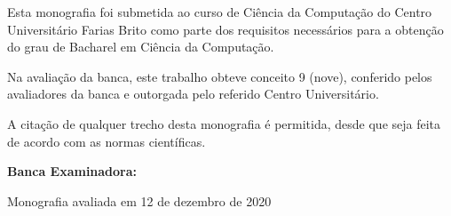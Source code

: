 \begin{folhadeaprovacao}


\begin{center}
    {\ABNTEXchapterfont\Large\bfseries\imprimirtitulo}\par
    {\ABNTEXchapterfont\large\textsc{\imprimirautor}}
\end{center}

\vspace{1cm}

Esta monografia foi submetida ao curso de Ciência da Computação do Centro Universitário Farias Brito como parte dos requisitos necessários para a obtenção do grau de Bacharel em Ciência da Computação.

\vspace{1cm}

Na avaliação da banca, este trabalho obteve conceito 9 (nove), conferido pelos avaliadores da banca e outorgada pelo referido Centro Universitário.

\vspace{1cm}

A citação de qualquer trecho desta monografia é permitida, desde que seja feita de acordo com as normas científicas.

\vspace{2cm}


\vspace{2cm}

\textbf{Banca Examinadora:}



\vspace{1cm}

\begin{center}
    Monografia avaliada em 12 de dezembro de 2020
\end{center}

\end{folhadeaprovacao}